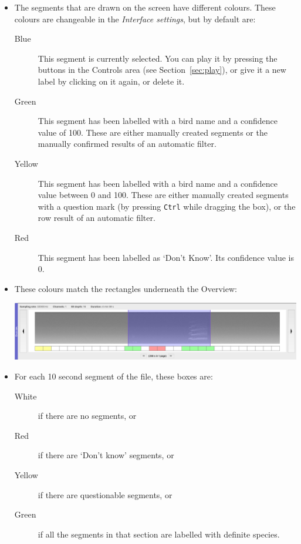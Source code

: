 \documentclass{scrartcl}
\begin{document}
\begin{itemize}

\item The segments that are drawn on the screen have different colours. These colours are changeable in the \textit{Interface settings}, but by default are:
	\begin{description} 
	\item[Blue] This segment is currently selected. You can play it by pressing the buttons in the Controls area (see Section~\ref{sec:play}), or give it a new label by clicking on it again, or delete it. 
	\item[Green] This segment has been labelled with a bird name and a confidence value of 100. These are either manually created segments or the manually confirmed results of an automatic filter.
	\item[Yellow] This segment has been labelled with a bird name and a confidence value between 0 and 100. These are either manually created segments with a question mark (by pressing \texttt{Ctrl} while dragging the box), or the row result of an automatic filter. 
	\item[Red] This segment has been labelled as `Don't Know'. Its confidence value is 0.
	\end{description}

\item These colours match the rectangles underneath the Overview:

\begin{center}
\includegraphics[width=.9\textwidth]{Figures/Overview}
\end{center}

\item For each 10 second segment of the file, these boxes are:
	\begin{description} 
 	\item[White] if there are no segments, or
	\item[Red] if there are `Don't know' segments, or
	\item[Yellow] if there are questionable segments, or 
	\item[Green] if all the segments in that section are labelled with definite species. 
	\end{description}
	

\end{itemize}
\end{document}
